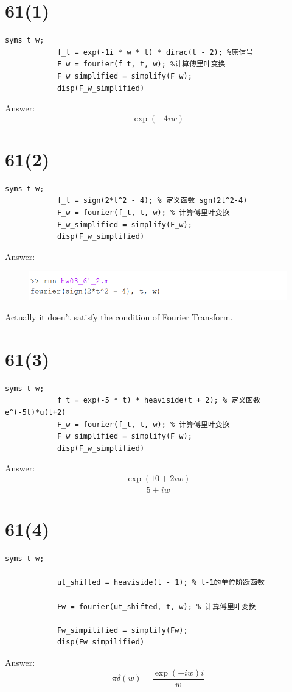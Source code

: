\documentclass{article}
\begin{document}
    \section*{61(1)}
        \begin{lstlisting}[caption={题61(1)MATLAB代码}, label={lst:matlab}]
            syms t w;
            f_t = exp(-1i * w * t) * dirac(t - 2); %原信号
            F_w = fourier(f_t, t, w); %计算傅里叶变换
            F_w_simplified = simplify(F_w);
            disp(F_w_simplified)

        \end{lstlisting}
        Answer: \[\exp \left( { - 4iw} \right)\]
    \section*{61(2)}
        \begin{lstlisting}[caption={题61(2)MATLAB代码}, label={lst:matlab}]
            syms t w;
            f_t = sign(2*t^2 - 4); % 定义函数 sgn(2t^2-4)
            F_w = fourier(f_t, t, w); % 计算傅里叶变换
            F_w_simplified = simplify(F_w);
            disp(F_w_simplified) 

        \end{lstlisting}
        Answer: 
            \begin{figure}[h]
                \includegraphics{hw03_61_2.png}
            \end{figure}
            \FloatBarrier
            Actually it doen't satisfy the condition of Fourier Transform.
    \section*{61(3)}
        \begin{lstlisting}[caption={题61(3)MATLAB代码}, label={lst:matlab}]
            syms t w;
            f_t = exp(-5 * t) * heaviside(t + 2); % 定义函数 e^(-5t)*u(t+2)
            F_w = fourier(f_t, t, w); % 计算傅里叶变换
            F_w_simplified = simplify(F_w);
            disp(F_w_simplified) 

        \end{lstlisting}
        Answer: \[\frac{{\exp \left( {10 + 2iw} \right)}}{{5 + iw}}\]
    \section*{61(4)}
        \begin{lstlisting}[caption={题61(4)MATLAB代码}, label={lst:matlab}]
            syms t w;

            ut_shifted = heaviside(t - 1); % t-1的单位阶跃函数

            Fw = fourier(ut_shifted, t, w); % 计算傅里叶变换

            Fw_simpilified = simplify(Fw);
            disp(Fw_simpilified) 

        \end{lstlisting}
        Answer: \[\pi \delta \left( w \right) - \frac{{\exp \left( { - iw} \right)i}}{w}\]
\end{document}
